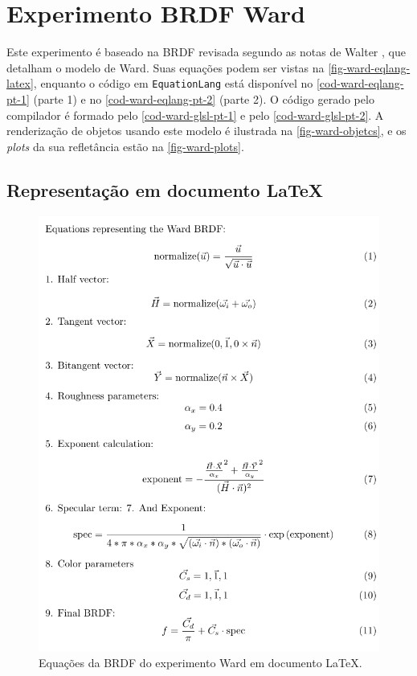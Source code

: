 \section{Experimento BRDF Ward}

Este experimento é baseado na BRDF revisada segundo as notas de Walter \cite{walter2005notes}, que detalham o modelo de Ward. Suas equações podem ser vistas na \autoref{fig-ward-eqlang-latex}, enquanto o código em \texttt{EquationLang} está disponível no \autoref{cod-ward-eqlang-pt-1} (parte 1) e no \autoref{cod-ward-eqlang-pt-2} (parte 2). O código gerado pelo compilador é formado pelo \autoref{cod-ward-glsl-pt-1} e pelo \autoref{cod-ward-glsl-pt-2}. A renderização de objetos usando este modelo é ilustrada na \autoref{fig-ward-objetcs}, e os \textit{plots} da sua refletância estão na \autoref{fig-ward-plots}.


\subsection{Representação em documento \LaTeX{}}
\begin{figure}[H]
    \caption{\label{fig-ward-eqlang-latex} \small Equações da BRDF do experimento Ward em documento \LaTeX{}.}
    \begin{center}
        \includegraphics[scale=0.92]{./Imagens/brdfs/ward.pdf}
    \end{center}
\end{figure}

